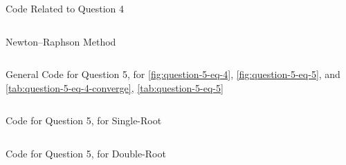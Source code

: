 \documentclass{article}
\begin{document}
\begin{listing}[htp]
    \inputminted[firstline=344, lastline=378]{python}{src/notebook.py}
    \caption{Code Related to Question 4}
    \label{lst:question-4}%
\end{listing}

\begin{listing}[htp]
    \inputminted[firstline=380, lastline=391]{python}{src/notebook.py}
    \caption{Newton--Raphson Method}
    \label{lst:programming-task-newton-raphson}%
\end{listing}

\begin{listing}[htp]
    \inputminted[firstline=393, lastline=443]{python}{src/notebook.py}
    \caption{General Code for Question 5, for \autoref{fig:question-5-eq-4}, \autoref{fig:question-5-eq-5}, and \autoref{tab:question-5-eq-4-converge}, \autoref{tab:question-5-eq-5}}
    \label{lst:question-5-general-code}%
\end{listing}

\begin{listing}[htp]
    \inputminted[firstline=445, lastline=491]{python}{src/notebook.py}
    \caption{Code for Question 5, for Single-Root}
    \label{lst:question-5-eq-4}%
\end{listing}

\begin{listing}[htp]
    \inputminted[firstline=493, lastline=512]{python}{src/notebook.py}
    \caption{Code for Question 5, for Double-Root}
    \label{lst:question-5-eq-5}%
\end{listing}
\end{document}
